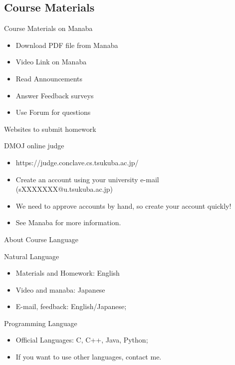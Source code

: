 \subsection{Course Materials}
\begin{frame}{Course Materials on Manaba}
  \begin{itemize}
  \item Download PDF file from Manaba
  \item Video Link on Manaba
  \item Read Announcements
  \item Answer Feedback surveys
  \item Use Forum for questions
  \end{itemize}
\end{frame}


\begin{frame}{Websites to submit homework}
  \begin{block}{DMOJ online judge}
    \begin{itemize}
      \item https://judge.conclave.cs.tsukuba.ac.jp/
        \medskip
        
      \item Create an account using your university e-mail (sXXXXXXX@u.tsukuba.ac.jp)
        \medskip

      \item We need to approve accounts by hand, so create your account quickly!
        \medskip
        
      \item See Manaba for more information.
    \end{itemize}
  \end{block}
\end{frame}

\begin{frame}{About Course Language}
  \begin{block}{Natural Language}
    \begin{itemize}
      \item Materials and Homework: English
      \item Video and manaba: Japanese
      \item E-mail, feedback: English/Japanese;
    \end{itemize}
  \end{block}

  \begin{block}{Programming Language}
    \begin{itemize}
      \item Official Languages: C, C++, Java, Python;
      \item If you want to use other languages, contact me.
    \end{itemize}
  \end{block}
\end{frame}

